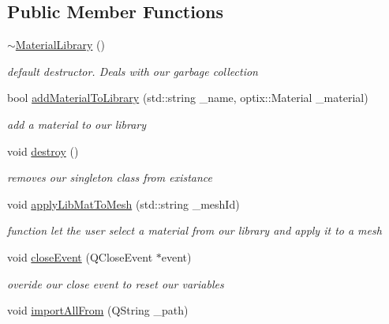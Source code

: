\subsection*{Public Member Functions}
\begin{DoxyCompactItemize}
\item 
\hypertarget{class_material_library_a8b0b82c532ada235ad3a74d623345600}{\hyperlink{class_material_library_a8b0b82c532ada235ad3a74d623345600}{$\sim$\-Material\-Library} ()}\label{class_material_library_a8b0b82c532ada235ad3a74d623345600}

\begin{DoxyCompactList}\small\item\em default destructor. Deals with our garbage collection \end{DoxyCompactList}\item 
bool \hyperlink{class_material_library_a6ed4adc6fb885d3a7cd69437117092c6}{add\-Material\-To\-Library} (std\-::string \-\_\-name, optix\-::\-Material \-\_\-material)
\begin{DoxyCompactList}\small\item\em add a material to our library \end{DoxyCompactList}\item 
\hypertarget{class_material_library_ad5e0c33418b4554c7167d8cff539f951}{void \hyperlink{class_material_library_ad5e0c33418b4554c7167d8cff539f951}{destroy} ()}\label{class_material_library_ad5e0c33418b4554c7167d8cff539f951}

\begin{DoxyCompactList}\small\item\em removes our singleton class from existance \end{DoxyCompactList}\item 
void \hyperlink{class_material_library_a505e48b500d1d04f6445c423a2fe66ac}{apply\-Lib\-Mat\-To\-Mesh} (std\-::string \-\_\-mesh\-Id)
\begin{DoxyCompactList}\small\item\em function let the user select a material from our library and apply it to a mesh \end{DoxyCompactList}\item 
\hypertarget{class_material_library_a7fa5922dfa78d16fafa8dc79ddaf427e}{void \hyperlink{class_material_library_a7fa5922dfa78d16fafa8dc79ddaf427e}{close\-Event} (Q\-Close\-Event $\ast$event)}\label{class_material_library_a7fa5922dfa78d16fafa8dc79ddaf427e}

\begin{DoxyCompactList}\small\item\em overide our close event to reset our variables \end{DoxyCompactList}\item 
\hypertarget{class_material_library_a93a390e382f15c20a3ba3d760cdb4bc5}{void \hyperlink{class_material_library_a93a390e382f15c20a3ba3d760cdb4bc5}{import\-All\-From} (Q\-String \-\_\-path)}\label{class_material_library_a93a390e382f15c20a3ba3d760cdb4bc5}


\end{DoxyCompactItemize}
